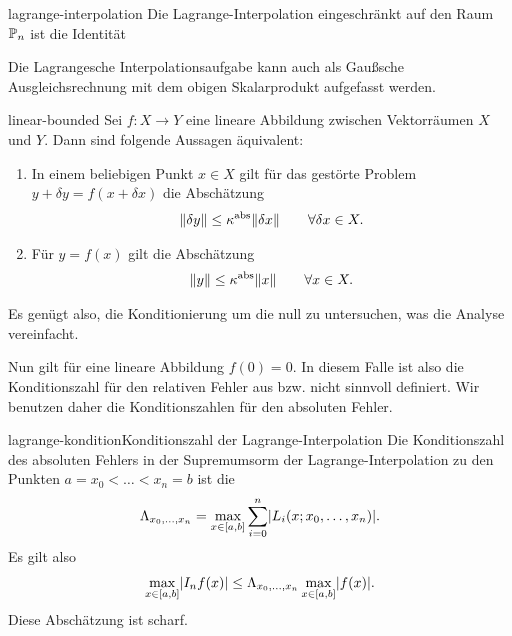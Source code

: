 \begin{Korollar}{lagrange-interpolation}
  Die Lagrange-Interpolation eingeschränkt auf den Raum $\P_n$ ist die
  Identität
\end{Korollar}
\begin{remark}
  Die Lagrangesche Interpolationsaufgabe kann auch als Gaußsche
  Ausgleichsrechnung mit dem obigen Skalarprodukt aufgefasst werden.
\end{remark}

\begin{Lemma}{linear-bounded}
  Sei $f\colon X \to Y$ eine lineare Abbildung zwischen Vektorräumen
  $X$ und $Y$. Dann sind folgende Aussagen äquivalent:
  \begin{enumerate}
  \item In einem beliebigen Punkt $x\in X$ gilt für das gestörte Problem
    $y+\delta y = f(x+\delta x)$ die Abschätzung
    \begin{gather}
      \norm{\delta y} \le \kappa^{\text{abs}} \norm{\delta x}
      \qquad\forall \delta x \in X.
    \end{gather}
  \item Für $y = f(x)$ gilt die Abschätzung
    \begin{gather}
      \norm{y} \le \kappa^{\text{abs}} \norm{x}
      \qquad\forall x \in X.
    \end{gather}
  \end{enumerate}
\end{Lemma}

\begin{remark}
  Es genügt also, die Konditionierung um die null zu untersuchen, was
  die Analyse vereinfacht.

  Nun gilt für eine lineare Abbildung $f(0) = 0$. In diesem Falle ist
  also die Konditionszahl für den relativen Fehler aus
  bzw.  nicht sinnvoll definiert. Wir
  benutzen daher die Konditionszahlen für den absoluten Fehler. 
\end{remark}

\begin{Satz*}{lagrange-kondition}{Konditionszahl der Lagrange-Interpolation}
  Die Konditionszahl des absoluten Fehlers in der Supremumsorm der
  Lagrange-Interpolation zu den Punkten $a = x_0 < \dots < x_n = b$
  ist die 
  \begin{gather}
    \Lambda_{x_0,\dots,x_n} = \max_{x\in [a,b]}
    \sum_{i=0}^n \abs{L_i(x;x_0,\dots,x_n)}.
  \end{gather}
  Es gilt also
  \begin{gather}
    \max _{x\in[a,b]} \abs{I_n f(x)}
    \le \Lambda_{x_0,\dots,x_n} \max _{x\in[a,b]} \abs{f(x)}.
  \end{gather}
  Diese Abschätzung ist scharf.
\end{Satz*}

